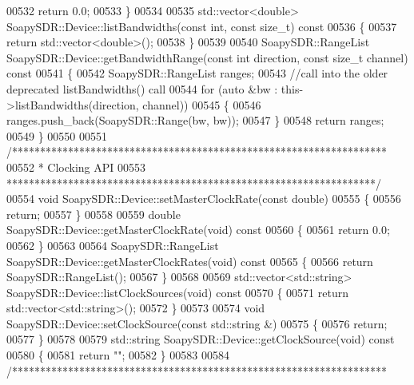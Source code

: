 \begin{DoxyCode}
00532     \textcolor{keywordflow}{return} 0.0;
00533 \}
00534 
00535 std::vector<double> SoapySDR::Device::listBandwidths(\textcolor{keyword}{const} \textcolor{keywordtype}{int}, \textcolor{keyword}{const} \textcolor{keywordtype}{size\_t})\textcolor{keyword}{ const}
00536 \textcolor{keyword}{}\{
00537     \textcolor{keywordflow}{return} std::vector<double>();
00538 \}
00539 
00540 SoapySDR::RangeList SoapySDR::Device::getBandwidthRange(\textcolor{keyword}{const} \textcolor{keywordtype}{int} direction, \textcolor{keyword}{const} \textcolor{keywordtype}{size\_t} channel)\textcolor{keyword}{ const}
00541 \textcolor{keyword}{}\{
00542     SoapySDR::RangeList ranges;
00543     \textcolor{comment}{//call into the older deprecated listBandwidths() call}
00544     \textcolor{keywordflow}{for} (\textcolor{keyword}{auto} &bw : this->listBandwidths(direction, channel))
00545     \{
00546         ranges.push\_back(SoapySDR::Range(bw, bw));
00547     \}
00548     \textcolor{keywordflow}{return} ranges;
00549 \}
00550 
00551 \textcolor{comment}{/*******************************************************************}
00552 \textcolor{comment}{ * Clocking API}
00553 \textcolor{comment}{ ******************************************************************/}
00554 \textcolor{keywordtype}{void} SoapySDR::Device::setMasterClockRate(\textcolor{keyword}{const} \textcolor{keywordtype}{double})
00555 \{
00556     \textcolor{keywordflow}{return};
00557 \}
00558 
00559 \textcolor{keywordtype}{double} SoapySDR::Device::getMasterClockRate(\textcolor{keywordtype}{void})\textcolor{keyword}{ const}
00560 \textcolor{keyword}{}\{
00561     \textcolor{keywordflow}{return} 0.0;
00562 \}
00563 
00564 SoapySDR::RangeList SoapySDR::Device::getMasterClockRates(\textcolor{keywordtype}{void})\textcolor{keyword}{ const}
00565 \textcolor{keyword}{}\{
00566     \textcolor{keywordflow}{return} SoapySDR::RangeList();
00567 \}
00568 
00569 std::vector<std::string> SoapySDR::Device::listClockSources(\textcolor{keywordtype}{void})\textcolor{keyword}{ const}
00570 \textcolor{keyword}{}\{
00571     \textcolor{keywordflow}{return} std::vector<std::string>();
00572 \}
00573 
00574 \textcolor{keywordtype}{void} SoapySDR::Device::setClockSource(\textcolor{keyword}{const} std::string &)
00575 \{
00576     \textcolor{keywordflow}{return};
00577 \}
00578 
00579 std::string SoapySDR::Device::getClockSource(\textcolor{keywordtype}{void})\textcolor{keyword}{ const}
00580 \textcolor{keyword}{}\{
00581     \textcolor{keywordflow}{return} \textcolor{stringliteral}{""};
00582 \}
00583 
00584 \textcolor{comment}{/*******************************************************************}

\end{DoxyCode}
